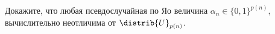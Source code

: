 Докажите, что любая псевдослучайная по Яо величина $\alpha_n \in \{0, 1\}^{p(n)}$, вычислительно
неотличима от $\distrib{U}_{p(n)}$.

